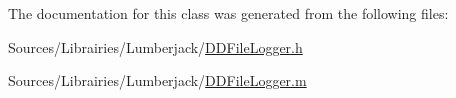 The documentation for this class was generated from the following files\-:\begin{DoxyCompactItemize}
\item 
Sources/\-Librairies/\-Lumberjack/\hyperlink{_d_d_file_logger_8h}{D\-D\-File\-Logger.\-h}\item 
Sources/\-Librairies/\-Lumberjack/\hyperlink{_d_d_file_logger_8m}{D\-D\-File\-Logger.\-m}\end{DoxyCompactItemize}
